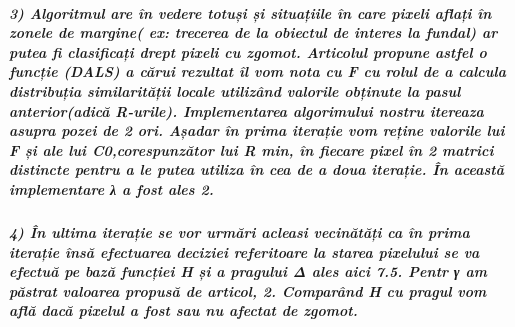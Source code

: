 \documentclass[11pt]{article}
\begin{document}
\subparagraph{3) Algoritmul are în vedere totuși și situațiile în care
pixeli aflați în zonele de margine( ex: trecerea de la obiectul de
interes la fundal) ar putea fi clasificați drept pixeli cu zgomot.
Articolul propune astfel o funcție (DALS) a cărui rezultat îl vom nota
cu F cu rolul de a calcula distribuția similarității locale utilizând
valorile obținute la pasul anterior(adică R-urile). Implementarea
algorimului nostru itereaza asupra pozei de 2 ori. Așadar în prima
iterație vom reține valorile lui F și ale lui C0,corespunzător lui R
min, în fiecare pixel în 2 matrici distincte pentru a le putea utiliza
în cea de a doua iterație. În această implementare λ a fost ales
2.}\label{algoritmul-are-uxeen-vedere-totuux219i-ux219i-situaux21biile-uxeen-care-pixeli-aflaux21bi-uxeen-zonele-de-margine-ex-trecerea-de-la-obiectul-de-interes-la-fundal-ar-putea-fi-clasificaux21bi-drept-pixeli-cu-zgomot.-articolul-propune-astfel-o-funcux21bie-dals-a-cux103rui-rezultat-uxeel-vom-nota-cu-f-cu-rolul-de-a-calcula-distribuux21bia-similaritux103ux21bii-locale-utilizuxe2nd-valorile-obux21binute-la-pasul-anterioradicux103-r-urile.-implementarea-algorimului-nostru-itereaza-asupra-pozei-de-2-ori.-aux219adar-uxeen-prima-iteraux21bie-vom-reux21bine-valorile-lui-f-ux219i-ale-lui-c0corespunzux103tor-lui-r-min-uxeen-fiecare-pixel-uxeen-2-matrici-distincte-pentru-a-le-putea-utiliza-uxeen-cea-de-a-doua-iteraux21bie.-uxeen-aceastux103-implementare-ux3bb-a-fost-ales-2.}

    \subparagraph{4) În ultima iterație se vor urmări acleasi vecinătăți ca
în prima iterație însă efectuarea deciziei referitoare la starea
pixelului se va efectuă pe bază funcției H și a pragului Δ ales aici
7.5. Pentr γ am păstrat valoarea propusă de articol, 2. Comparând H cu
pragul vom află dacă pixelul a fost sau nu afectat de
zgomot.}\label{uxeen-ultima-iteraux21bie-se-vor-urmux103ri-acleasi-vecinux103tux103ux21bi-ca-uxeen-prima-iteraux21bie-uxeensux103-efectuarea-deciziei-referitoare-la-starea-pixelului-se-va-efectuux103-pe-bazux103-funcux21biei-h-ux219i-a-pragului-ux3b4-ales-aici-7.5.-pentr-ux3b3-am-pux103strat-valoarea-propusux103-de-articol-2.-comparuxe2nd-h-cu-pragul-vom-aflux103-dacux103-pixelul-a-fost-sau-nu-afectat-de-zgomot.}

 
\end{document}
